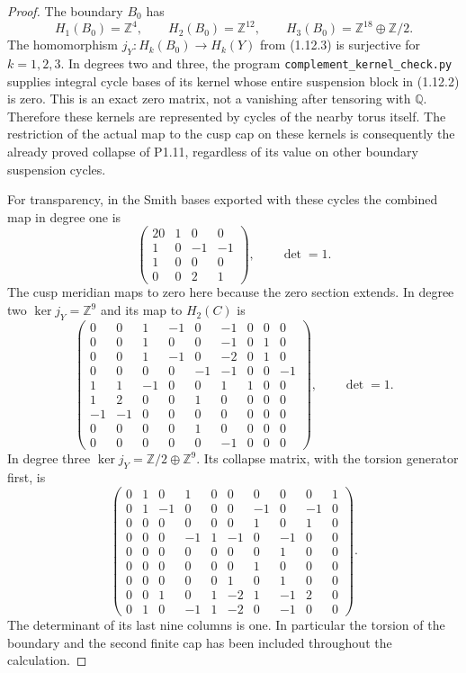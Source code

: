 \begin{proof}
The boundary $B_0$ has
\[
H_1(B_0)=\mathbb Z^4,\qquad H_2(B_0)=\mathbb Z^{12},\qquad
H_3(B_0)=\mathbb Z^{18}\oplus\mathbb Z/2.
\]
The homomorphism $j_Y:H_k(B_0)\to H_k(Y)$ from (1.12.3) is
surjective for $k=1,2,3$.  In degrees two and three, the program
\texttt{complement\_kernel\_check.py} supplies integral cycle bases
of its kernel whose entire suspension block in (1.12.2) is zero.
This is an exact zero matrix, not a vanishing after tensoring with
$\mathbb Q$.  Therefore these kernels are represented by cycles of
the nearby torus itself.  The restriction of the actual map to the
cusp cap on these kernels is consequently the already proved
collapse of P1.11, regardless of its value on other boundary
suspension cycles.

For transparency, in the Smith bases exported with these cycles the
combined map in degree one is
\[
\begin{pmatrix}20&1&0&0\\1&0&-1&-1\\1&0&0&0\\0&0&2&1\end{pmatrix},
\qquad\det=1.
\tag{1.12.7}
\]
The cusp meridian maps to zero here because the zero section extends.
In degree two $\ker j_Y=\mathbb Z^9$ and its map to $H_2(C)$ is
\[
\begin{pmatrix}
0&0&1&-1&0&-1&0&0&0\\
0&0&1&0&0&-1&0&1&0\\
0&0&1&-1&0&-2&0&1&0\\
0&0&0&0&-1&-1&0&0&-1\\
1&1&-1&0&0&1&1&0&0\\
1&2&0&0&1&0&0&0&0\\
-1&-1&0&0&0&0&0&0&0\\
0&0&0&0&1&0&0&0&0\\
0&0&0&0&0&-1&0&0&0
\end{pmatrix},\qquad\det=1.
\tag{1.12.8}
\]
In degree three $\ker j_Y=\mathbb Z/2\oplus\mathbb Z^9$.
Its collapse matrix, with the torsion generator first, is
\[
\begin{pmatrix}
0&1&0&1&0&0&0&0&0&1\\
0&1&-1&0&0&0&-1&0&-1&0\\
0&0&0&0&0&0&1&0&1&0\\
0&0&0&-1&1&-1&0&-1&0&0\\
0&0&0&0&0&0&0&1&0&0\\
0&0&0&0&0&0&1&0&0&0\\
0&0&0&0&0&1&0&1&0&0\\
0&0&1&0&1&-2&1&-1&2&0\\
0&1&0&-1&1&-2&0&-1&0&0
\end{pmatrix}.
\tag{1.12.9}
\]
The determinant of its last nine columns is one.  In particular the
torsion of the boundary and the second finite cap has been included
throughout the calculation.


\end{proof}
